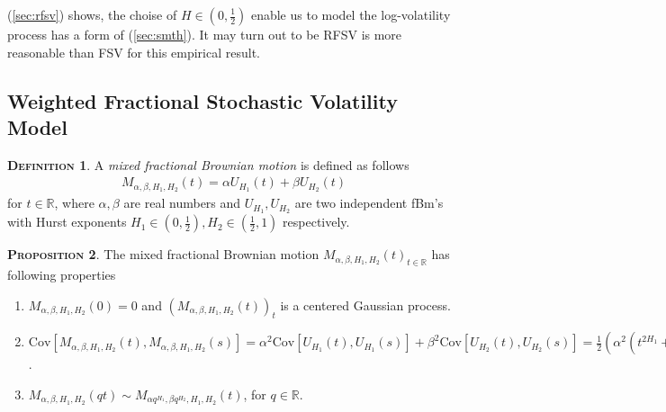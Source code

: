 \documentclass[a4paper, twoside, 11pt]{article}
\theoremstyle{definition}
\newtheorem{definition}{\scshape Definition}[section]
\newtheorem{proposition}[definition]{\scshape Proposition}
\newcommand{\brkt}[1]{\left({#1} \right)}
\begin{document}
(\ref{sec:rfsv}) shows, the choise of $H\in(0,\frac{1}{2})$ enable us to model the log-volatility process has a form of (\ref{sec:smth}). It may turn out to be RFSV is more reasonable than FSV for this empirical result.

\subsection{Weighted Fractional Stochastic Volatility Model}
\begin{definition}
  A \emph{mixed fractional Brownian motion} is defined as follows
\begin{eqnarray}
  M_{\alpha,\beta,H_1,H_2}(t) = \alpha U_{H_1}(t) + \beta U_{H_2}(t)
  \label{sec:mfsv}
\end{eqnarray}
for $t\in \mathbb{R}$, where $\alpha, \beta$ are real numbers and $U_{H_1}, U_{H_2}$ are two independent fBm's with Hurst exponents $H_1 \in (0, \frac{1}{2}), H_2 \in (\frac{1}{2}, 1)$ respectively.
\end{definition}

\begin{proposition}
  The mixed fractional Brownian motion $M_{\alpha,\beta,H_1,H_2}(t)_{t\in\mathbb{R}}$ has following properties
   \begin{enumerate}[topsep=0pt, itemsep=-1ex, partopsep=1ex, parsep=1ex, label=(\roman*)]
	 \item $M_{\alpha,\beta,H_1,H_2}(0) = 0$ and $(M_{\alpha,\beta,H_1,H_2}(t))_t$ is a centered Gaussian  process.
	 \item $\mathrm{Cov}[M_{\alpha,\beta,H_1,H_2}(t), M_{\alpha,\beta,H_1,H_2}(s)] = \alpha^2 \mathrm{Cov}[U_{H_1}(t), U_{H_1}(s)] + \beta^2\mathrm{Cov}[U_{H_2}(t), U_{H_2}(s)] = \frac{1}{2}\brkt{\alpha^2(t^{2H_1}+s^{2H_1}+|t-s|^{2H_1}) + \beta^2(t^{2H_2} + s^{2H_2} + |t-s|^{2H_2})}$. 
	 \item $M_{\alpha, \beta, H_1, H_2}(qt) \sim M_{\alpha q^{H_1}, \beta q^{H_2}, H_1, H_2}(t)$, for $q\in\mathbb{R}$.
	 \end{enumerate}
	 \label{sec:prop}
\end{proposition}
\end{document}
